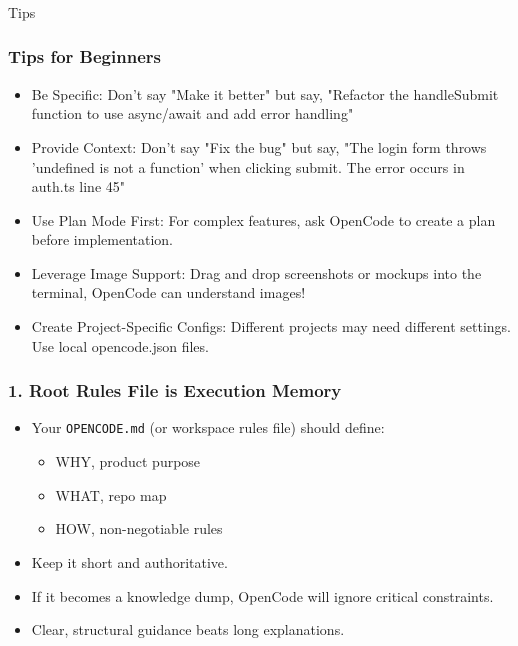 \begin{frame}[fragile]\frametitle{}

\begin{center}
{\Large Tips}
\end{center}
\end{frame}

\begin{frame}[fragile]\frametitle{Tips for Beginners}
  \begin{itemize}
    \item Be Specific: 
Don't say "Make it better" but say, "Refactor the handleSubmit function to use async/await and add error handling"

    \item Provide Context: Don't say "Fix the bug" but say, "The login form throws 'undefined is not a function' when clicking submit. The error occurs in auth.ts line 45"

    \item Use Plan Mode First: For complex features, ask OpenCode to create a plan before implementation.

    \item Leverage Image Support: Drag and drop screenshots or mockups into the terminal, OpenCode can understand images!

    \item Create Project-Specific Configs: Different projects may need different settings. Use local opencode.json files.
  \end{itemize}
\end{frame}

\begin{frame}[fragile]\frametitle{1. Root Rules File is Execution Memory}
  \begin{itemize}
    \item Your \texttt{OPENCODE.md} (or workspace rules file) should define:
    \begin{itemize}
        \item WHY, product purpose
        \item WHAT, repo map
        \item HOW, non-negotiable rules
    \end{itemize}
    \item Keep it short and authoritative.
    \item If it becomes a knowledge dump, OpenCode will ignore critical constraints.
    \item Clear, structural guidance beats long explanations.
  \end{itemize}
\end{frame}

